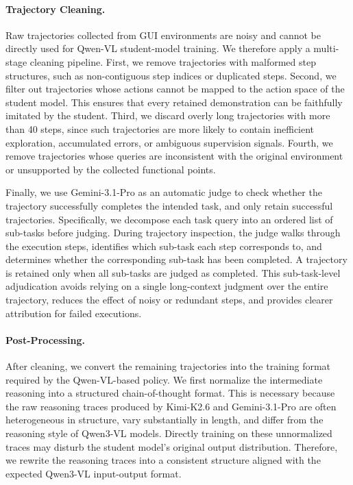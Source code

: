 \paragraph{Trajectory Cleaning.}
Raw trajectories collected from GUI environments are noisy and cannot be
directly used for Qwen-VL student-model training. We therefore apply a multi-stage
cleaning pipeline. First, we remove trajectories with malformed step
structures, such as non-contiguous step indices or duplicated steps. Second,
we filter out trajectories whose actions cannot be mapped to the action space
of the student model. This ensures that every retained demonstration can be
faithfully imitated by the student. Third, we discard overly long trajectories
with more than 40 steps, since such trajectories are more likely to contain
inefficient exploration, accumulated errors, or ambiguous supervision signals.
Fourth, we remove trajectories whose queries are inconsistent with the original
environment or unsupported by the collected functional points.


Finally, we use Gemini-3.1-Pro as an automatic judge to check whether the trajectory
successfully completes the intended task, and only retain successful
trajectories. Specifically, we decompose each task query into an
ordered list of sub-tasks before judging. During trajectory inspection, the
judge walks through the execution steps, identifies which sub-task each step
corresponds to, and determines whether the corresponding sub-task has been
completed. A trajectory is retained only when all sub-tasks are judged as
completed. This sub-task-level adjudication avoids relying on a single
long-context judgment over the entire trajectory, reduces the effect of noisy
or redundant steps, and provides clearer attribution for failed executions.



\paragraph{Post-Processing.}
After cleaning, we convert the remaining trajectories into the training format
required by the Qwen-VL-based policy. We first normalize the intermediate
reasoning into a structured chain-of-thought format. This is necessary because
the raw reasoning traces produced by Kimi-K2.6 and
Gemini-3.1-Pro are often heterogeneous in structure, vary
substantially in length, and differ from the reasoning style of Qwen3-VL
models. Directly training on these unnormalized traces may disturb the
student model's original output distribution. Therefore, we rewrite the
reasoning traces into a consistent structure aligned with the expected
Qwen3-VL input-output format.

